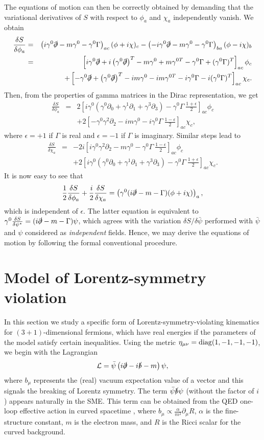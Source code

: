 \documentclass[11pt,prd,aps,amssymb,amsmath,tightenlines,showpacs]{revtex4}
\newcommand{\be}{\begin{equation}}
\newcommand{\ee}{\end{equation}}
\newcommand{\bea}{\begin{eqnarray}}
\newcommand{\eea}{\end{eqnarray}}
\newcommand{\nn}{\nonumber\\}
\begin{document}
The equations of motion can then be correctly obtained by demanding that the
variational derivatives of $S$ with respect to $\phi_a$ and $\chi_a$
independently vanish. We obtain 
\bea
\frac{\delta S}{\delta\phi_a}
&=&\left(i\gamma^0\slashed\partial-m\gamma^0-\gamma^0\Gamma\right)_{ac}(\phi+
i\chi)_c-\left(-i\gamma^0\slashed\partial-m\gamma^0-\gamma^0\Gamma\right)_{
ba}(\phi-i\chi)_b\nonumber\\
&=&\left[i\gamma^0\slashed\partial+i\left(\gamma^0\slashed\partial\right)^T-m
\gamma^0+m\gamma^{0T}-\gamma^0\Gamma+(\gamma^0\Gamma)^T\right]_{ac}\phi_c\nn
&&+\left[-\gamma^0\slashed\partial+\left(\gamma^0\slashed\partial\right)^T-im
\gamma^0-im\gamma^{0T}-i\gamma^0\Gamma-i(\gamma^0\Gamma)^T\right]_{ac}\chi_c.
\nonumber
\eea
Then, from the properties of gamma matrices in the Dirac representation, we get
\bea
\frac{\delta S}{\delta\phi_a}
&=&2\left[i\gamma^0(\gamma^0\partial_0+\gamma^1\partial_1+\gamma^3\partial_3)-
\gamma^0\Gamma~\frac{1+\epsilon}{2}\right]_{ac}\phi_c\nonumber\\
&&+2\left[-\gamma^0\gamma^2\partial_2-im\gamma^0-i\gamma^0\Gamma~\frac{1-
\epsilon}{2}\right]_{ac}\chi_c,\nonumber
\eea
where $\epsilon=+1$ if $\Gamma$ is real and $\epsilon=-1$ if $\Gamma$ is
imaginary. Similar steps lead to
\bea
\frac{\delta S}{\delta\chi_a}&=&-2i\left[i\gamma^0\gamma^2\partial_2-m\gamma^0-
\gamma^0\Gamma~\frac{1-\epsilon}{2}\right]_{ac}\phi_c\nonumber\\
&&+2\left[i\gamma^0(\gamma^0\partial_0+\gamma^1\partial_1+\gamma^3\partial_3)-
\gamma^0\Gamma~\frac{1+\epsilon}{2}\right]_{ac}\chi_c.\nonumber
\eea
It is now easy to see that 
$$\frac{1}{2}\frac{\delta S}{\delta\phi_a}+\frac{i}{2}\frac{\delta S}{\delta
\chi_a}=\left(\gamma^0(i\slashed\partial-m-\Gamma)(\phi+i\chi)\right)_a,$$
which is independent of $\epsilon$. The latter equation is equivalent to
$\gamma^0\frac{\delta S}{\delta\psi^\star}=(i\slashed\partial-m-\Gamma)\psi$,
which agrees with the variation $\delta S/\delta\bar\psi$ performed with $\bar
\psi$ and $\psi$ considered as {\it independent} fields. Hence, we may derive
the equations of motion by following the formal conventional procedure.

\section{Model of Lorentz-symmetry violation} 
\label{s2} 
In this section we study a specific form of Lorentz-symmetry-violating
kinematics for $(3+1)$-dimensional fermions, which have real energies if the
parameters of the model satisfy certain inequalities. Using the metric 
$\eta_{\mu\nu}={\rm diag}(1,-1,-1,-1)$, we begin with the Lagrangian
\be
{\cal L}=\bar\psi\left(i\slashed\partial-i\slashed b-m\right)\psi,
\label{e2}
\ee
where $b_\mu$ represents the (real) vacuum expectation value of a vector and
this signals the breaking of Lorentz symmetry. The term $\bar\psi\slashed b\psi$
(without the factor of $i$) appears naturally in the SME. This term can be
obtained from the QED one-loop effective action in curved spacetime \cite{r9},
where $b_\mu\propto\frac{\alpha}{m^2}\partial_\mu R$, $\alpha$ is the
fine-structure constant, $m$ is the electron mass, and $R$ is the Ricci scalar
for the curved background.
\end{document}
